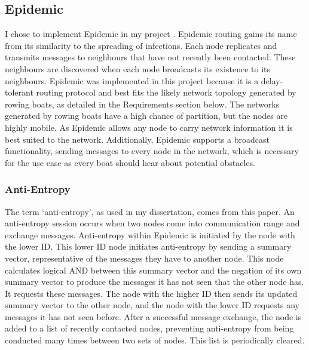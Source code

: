 \documentclass[12pt,a4paper]{report}
\begin{document}
\subsection{Epidemic}
I chose to implement Epidemic in my project \cite{epidemic}. Epidemic routing gains its name from its similarity to the spreading of infections. Each node replicates and transmits messages to neighbours that have not recently been contacted. These neighbours are discovered when each node broadcasts its existence to its neighbours. Epidemic was implemented in this project because it is a delay-tolerant routing protocol and best fits the likely network topology generated by rowing boats, as detailed in the Requirements section below. The networks generated by rowing boats have a high chance of partition, but the nodes are highly mobile. As Epidemic allows any node to carry network information it is best suited to the network. Additionally, Epidemic supports a broadcast functionality, sending messages to every node in the network, which is necessary for the use case as every boat should hear about potential obstacles. \\ 
\subsubsection{Anti-Entropy}
The term `anti-entropy', as used in my dissertation, comes from this paper. An anti-entropy session occurs when two nodes come into communication range and exchange messages. Anti-entropy within Epidemic is initiated by the node with the lower ID. This lower ID node initiates anti-entropy by sending a summary vector, representative of the messages they have to another node. This node calculates logical AND between this summary vector and the negation of its own summary vector to produce the messages it has not seen that the other node has. It requests these messages. The node with the higher ID then sends its updated summary vector to the other node, and the node with the lower ID requests any messages it has not seen before. After a successful message exchange, the node is added to a list of recently contacted nodes, preventing anti-entropy from being conducted many times between two sets of nodes. This list is periodically cleared. 
\end{document}
